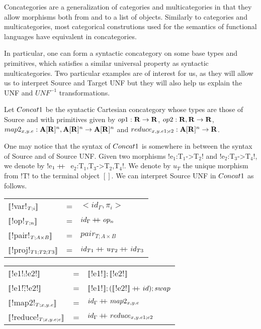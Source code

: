 Concategories are a generalization of categories and multicategories in that 
they allow morphisms both from and to a list of objects. 
Similarly to categories and multicategories, 
most categorical construtions used for the semantics of functional languages 
have equivalent in concategories.

In particular, one can form a syntactic concategory on some base types and primitives, 
which satisfies a similar universal property as syntactic multicategories.
Two particular examples are of interest for us, as they will allow us to interpret Source and Target UNF
but they will also help us explain the UNF and $UNF^{-1}$ transformations.

\begin{definition}[$\ConcatS$]
Let $\ConcatS$ be the syntactic Cartesian concategory whose types are those of Source and 
with primitives given by $op1: \mathbf{R} \to \mathbf{R}$, $op2: \mathbf{R},\mathbf{R} \to \mathbf{R}$, 
$map2_{x,y.e}: \mathbf{A}[\mathbf{R}]^{n},\mathbf{A}[\mathbf{R}]^{n}\to \mathbf{A}[\mathbf{R}]^{n}$ and $reduce_{x,y.e1;e2}:\mathbf{A}[\mathbf{R}]^{n}\to \mathbf{R}$.
\end{definition}

One may notice that the syntax of $\ConcatS$ is somewhere in between the syntax of Source and of Source UNF.
Given two morphisms !e$_1$:T$_1$->T$_2$! and !e$_2$:T$_3$->T$_4$!, we denote by !e$_1 +\kern-1.3ex+\kern0.8ex$ e$_2$:T$_1$,T$_3$->T$_2$,T$_4$!.
We denote by $u_T$ the unique morphism from !T! to the terminal object $[]$.
We can interpret Source UNF in $\ConcatS$ as follows.

\begin{tabular}{l c l}
   $\llbracket$!var!$_{T;i} \rrbracket$ &=& $<id_\Gamma,\pi_i>$ \\
   $\llbracket$!op!$_{T;n} \rrbracket$ &=& $id_\Gamma+\kern-1.3ex+\kern0.8ex op_n$\\
   $\llbracket$!pair!$_{T;A\times B} \rrbracket$ &=& $pair_{T;A\times B}$ \\
   $\llbracket$!proj!$_{T1;T2;T3} \rrbracket$ &=& $id_{T1}+\kern-1.3ex+\kern0.8ex u_{T2}+\kern-1.3ex+\kern0.8ex id_{T3}$
    \end{tabular}
   \begin{tabular}{l c l}
   $\llbracket$!e1!$\comp$!e2!$\rrbracket$  &=& $\llbracket$!e1!$\rrbracket ; \llbracket$!e2!$\rrbracket$ \\
   $\llbracket$!e1!$\widetilde{;}$!e2!$\rrbracket$ &=& $\llbracket$!e1!$\rrbracket ; (\llbracket$!e2!$\rrbracket+\kern-1.3ex+\kern0.8ex id ); swap$ \\
   $\llbracket$!map2!$_{T;x,y.e}\rrbracket$  &=& $id_\Gamma+\kern-1.3ex+\kern0.8ex map2_{x,y.e}$ \\
   $\llbracket$!reduce!$_{T;x,y.e;e}\rrbracket$ &=& $id_\Gamma+\kern-1.3ex+\kern0.8ex reduce_{x,y.e1;e2}$
\end{tabular}

